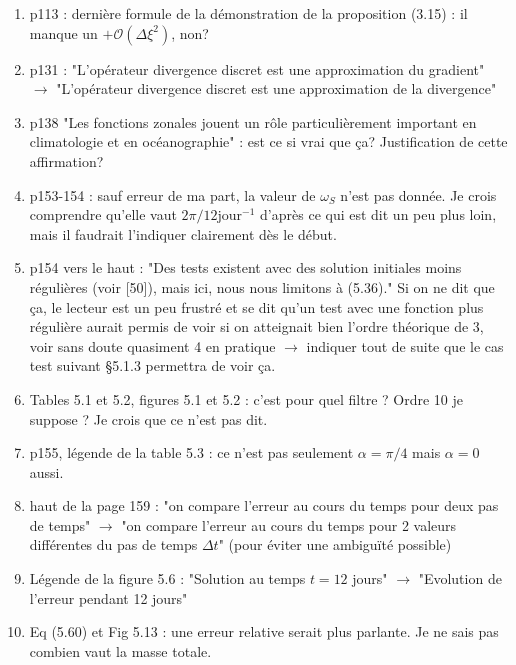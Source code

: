 \documentclass[10pt,a4paper]{article}
\begin{document}
\begin{enumerate}
\item p113 : dernière formule de la démonstration de la proposition (3.15) : il manque un $+ \mathcal{O}(\Delta \xi^2)$, non?


\item p131 : "L'opérateur divergence discret est une approximation du gradient" $\rightarrow$ "L'opérateur divergence discret est une approximation de la divergence"


\item p138 "Les fonctions zonales jouent un rôle particulièrement important en climatologie et en océanographie" : est ce si vrai que ça? Justification de cette affirmation?


\item p153-154 : sauf erreur de ma part, la valeur de $\omega_S$ n'est pas donnée. Je crois comprendre qu'elle vaut $2\pi/12 \text{jour}^{-1}$ d'après ce qui est dit un peu plus loin, mais il faudrait l'indiquer clairement dès le début.


\item p154 vers le haut : "Des tests existent avec des solution initiales moins régulières (voir [50]), mais ici, nous nous limitons à (5.36)." Si on ne dit que ça, le lecteur est un peu frustré et se dit qu'un test avec une fonction plus régulière aurait permis de voir si on atteignait bien l'ordre théorique de 3, voir sans doute quasiment 4 en pratique $\rightarrow$ indiquer tout de suite que le cas test suivant §5.1.3 permettra de voir ça.


\item Tables 5.1 et 5.2, figures 5.1 et 5.2 : c’est pour quel filtre ? Ordre 10 je suppose ? Je
crois que ce n’est pas dit.


\item p155, légende de la table 5.3 : ce n'est pas seulement $\alpha = \pi/4$ mais $\alpha=0$ aussi. 



\item haut de la page 159 :  "on compare l'erreur au cours du temps pour deux pas de temps" $\rightarrow$ "on compare l'erreur au cours du temps pour 2 valeurs différentes du pas de temps $\Delta t$" (pour éviter une ambiguïté possible) 



\item Légende de la figure 5.6 : "Solution au temps $t=12$ jours" $\rightarrow$ "Evolution de l'erreur pendant 12 jours"


\item Eq (5.60) et Fig 5.13 : une erreur relative serait plus parlante. Je ne sais pas combien vaut la masse totale.



\end{enumerate}
\end{document}
